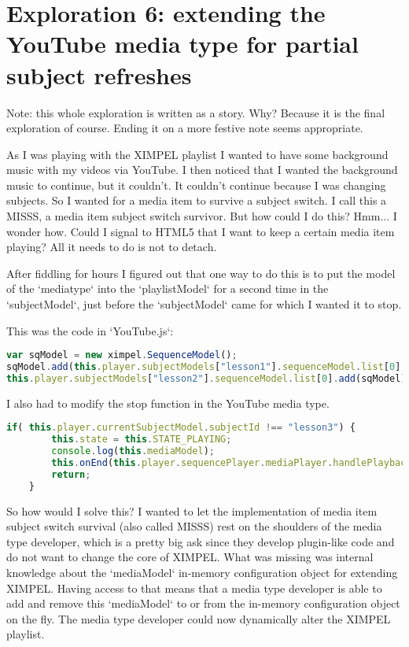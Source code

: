\chapter{Exploration 6: extending the YouTube media type for partial subject refreshes}
Note: this whole exploration is written as a story. Why? Because it is the final exploration of course. Ending it on a more festive note seems appropriate.

As I was playing with the XIMPEL playlist I wanted to have some background music with my videos via YouTube. I then noticed that I wanted the background music to continue, but it couldn't. It couldn't continue because I was changing subjects. So I wanted for a media item to survive a subject switch. I call this a MISSS, a media item subject switch survivor. But how could I do this? Hmm... I wonder how. Could I signal to HTML5 that I want to keep a certain media item playing? All it needs to do is not to detach.

After fiddling for hours I figured out that one way to do this is to put the model of the `mediatype` into the `playlistModel` for a second time in the `subjectModel`, just before the `subjectModel` came for which I wanted it to stop.

This was the code in `YouTube.js`:
\begin{lstlisting}[language=JavaScript]
var sqModel = new ximpel.SequenceModel();
sqModel.add(this.player.subjectModels["lesson1"].sequenceModel.list[0].list[0].list[0]);
this.player.subjectModels["lesson2"].sequenceModel.list[0].add(sqModel);
\end{lstlisting}
	
I also had to modify the stop function in the YouTube media type.

\begin{lstlisting}[language=JavaScript]
	if( this.player.currentSubjectModel.subjectId !== "lesson3") {
		this.state = this.STATE_PLAYING;
		console.log(this.mediaModel);
		this.onEnd(this.player.sequencePlayer.mediaPlayer.handlePlaybackEnd.bind(this));
		return;
	}
\end{lstlisting}

So how would I solve this? I wanted to let the implementation of media item subject switch survival (also called MISSS) rest on the shoulders of the media type developer, which is a pretty big ask since they develop plugin-like code and do not want to change the core of XIMPEL. What was missing was internal knowledge about the `mediaModel` in-memory configuration object for extending XIMPEL. Having access to that means that a media type developer is able to add and remove this `mediaModel` to or from the in-memory configuration object on the fly. The media type developer could now dynamically alter the XIMPEL playlist.

